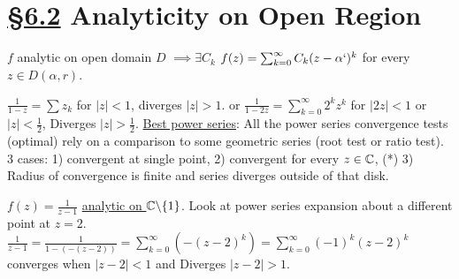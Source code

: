 \documentclass[]{article}
\begin{document}
\section{\underline{\S6.2} Analyticity on Open Region}
\begin{definition}
	 $f$ analytic on open domain $D$ $\implies \exists C_k$ $f(z) = \sum_{k=0}^\infty C_k(z-\alpha`)^k$ for every $z\in D(\alpha,r)$.
\end{definition}
\begin{recall}
	$\frac{1}{1-z} = \sum z_k$ for $|z|<1$, diverges $|z|>1$. or $\frac{1}{1-2z} = \sum_{k=0}^\infty 2^k z^k$ for $|2z|<1$ or $|z|<\frac{1}{2}$, Diverges $|z|>\frac{1}{2}$.
	\underline{Best power series}: All the power series convergence tests (optimal) rely on a comparison to some geometric series (root test or ratio test). 3 cases: 1) convergent at single point, 2) convergent for every $z\in \mathbb{C}$, (*) 3) Radius of convergence is finite and series diverges outside of that disk.
\end{recall}
\begin{example}
	$f(z) = \frac{1}{z-1}$ \underline{analytic on $\mathbb{C}\backslash \{1\}$}. Look at power series expansion about a different point at $z=2$. $\frac{1}{z-1} = \frac{1}{1-(-(z-2))} = \sum_{k=0}^\infty (-(z-2)^k) = \sum_{k=0}^\infty (-1)^k (z-2)^k$ converges when $|z-2|<1$ and Diverges $|z-2|>1$.
\end{example}
\end{document}
